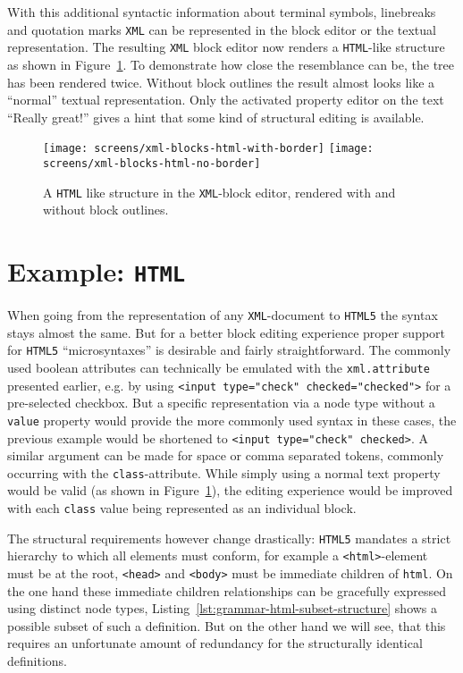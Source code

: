 \documentclass[sigconf,natbib=false]{acmart}
\begin{document}
With this additional syntactic information about terminal symbols, linebreaks and quotation marks \texttt{XML} can be represented in the block editor or the textual representation. The resulting \texttt{XML} block editor now renders a \texttt{HTML}-like structure as shown in Figure~\ref{fig:screen-editor-xml-no-border}. To demonstrate how close the resemblance can be, the tree has been rendered twice. Without block outlines the result almost looks like a \enquote{normal} textual representation. Only the activated property editor on the text \enquote{Really great!} gives a hint that some kind of structural editing is available.

\begin{figure}
  \texttt{[image: screens/xml-blocks-html-with-border]}
  \texttt{[image: screens/xml-blocks-html-no-border]}
  \caption{A \texttt{HTML} like structure in the \texttt{XML}-block editor, rendered with and without block outlines.}
  \label{fig:screen-editor-xml-no-border}
\end{figure}

\section{Example: \texttt{HTML}}

When going from the representation of any \texttt{XML}-document to \texttt{HTML5} the syntax stays almost the same. But for a better block editing experience proper support for \texttt{HTML5} \enquote{microsyntaxes} is desirable and fairly straightforward. The commonly used boolean attributes can technically be emulated with the \texttt{xml.attribute} presented earlier, e.g. by using \texttt{<input type="check" checked="checked">} for a pre-selected checkbox. But a specific representation via a node type without a \texttt{value} property would provide the more commonly used syntax in these cases, the previous example would be shortened to \texttt{<input type="check" checked>}. A similar argument can be made for space or comma separated tokens, commonly occurring with the \texttt{class}-attribute. While simply using a normal text property would be valid (as shown in Figure~\ref{fig:screen-editor-xml-no-border}), the editing experience would be improved with each \texttt{class} value being represented as an individual block.

The structural requirements however change drastically: \texttt{HTML5} mandates a strict hierarchy to which all elements must conform, for example a \texttt{<html>}-element must be at the root, \texttt{<head>} and \texttt{<body>} must be immediate children of \texttt{html}. On the one hand these immediate children relationships can be gracefully expressed using distinct node types, Listing~\ref{lst:grammar-html-subset-structure} shows a possible subset of such a definition. But on the other hand we will see, that this requires an unfortunate amount of redundancy for the structurally identical definitions.
\end{document}
